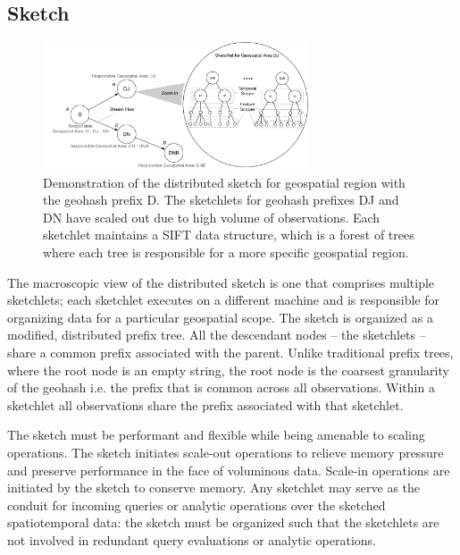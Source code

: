 \subsection{Sketch}
\begin{figure}
    \centerline{\includegraphics[width=0.7\textwidth]{figures/dist-sketch.pdf}}
    \caption{Demonstration of the distributed sketch for geospatial region with the geohash prefix D. The sketchlets for geohash prefixes DJ and DN have scaled out due to high volume of observations. Each sketchlet maintains a SIFT data structure, which is a forest of trees where each tree is responsible for a more specific geospatial region.}
    \label{fig:dist-sketch}
\end{figure}

The macroscopic view of the distributed sketch is one that comprises multiple sketchlets; each sketchlet executes on a different machine and is responsible for organizing data for a particular geospatial scope. The sketch is organized as a modified, distributed prefix tree. All the descendant nodes -- the sketchlets -- share a common prefix associated with the parent. Unlike traditional prefix trees, where the root node is an empty string, the root node is the coarsest granularity of the geohash i.e. the prefix that is common across all observations. Within a sketchlet all observations share the prefix associated with that sketchlet.

The sketch must be performant and flexible while being amenable to scaling operations. The sketch initiates scale-out operations to relieve memory pressure and preserve performance in the face of voluminous data. Scale-in operations are initiated by the sketch to conserve memory. Any sketchlet may serve as the conduit for incoming queries or analytic operations over the sketched spatiotemporal data: the sketch must be organized such that the sketchlets are not involved in redundant query evaluations or analytic operations. 


